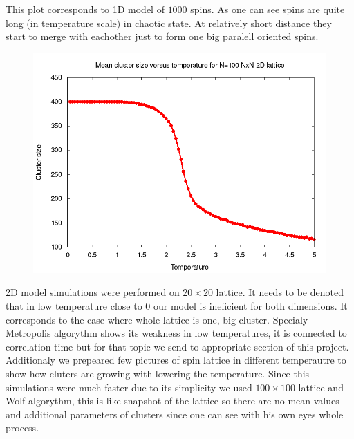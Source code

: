 \documentclass[a4paper,12pt,titlepage]{article}
\begin{document}
  This plot corresponds to 1D model of $1000$ spins. As one can see spins are quite long (in temperature scale) in chaotic state. At relatively short
  distance they start to merge with eachother just to form one big paralell oriented spins.
  
  \newpage
  \begin{figure}[h]
    \centering
    \includegraphics[scale=0.5]{plots/IsingTestMeanClusterFreq2D.png}
  \end{figure}
  
  2D model simulations were performed on $20\times20$ lattice. It needs to be denoted that in low temperature close to $0$ our model 
  is ineficient for both dimensions. It corresponds to the case where whole lattice is one, big cluster. Specialy Metropolis algorythm shows its weakness in
  low temperatures, it is connected to correlation time but for that topic we send to appropriate section of this project.
  \newpage
  Additionaly we prepeared few pictures of spin lattice in different temperautre to show
  how cluters are growing with lowering the temperature. Since this simulations were much faster due to its simplicity we used $100\times 100$ lattice
  and Wolf algorythm, this is like snapshot of the lattice so there are no mean values and additional parameters of clusters since one
  can see with his own eyes whole process.
  
\end{document}
